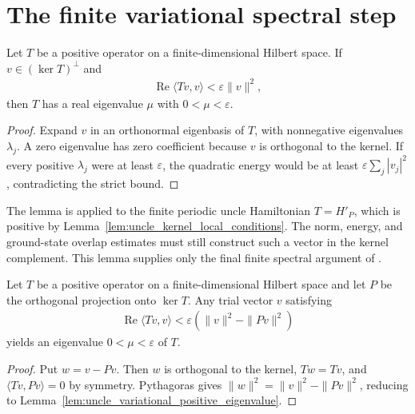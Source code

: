 \section{The finite variational spectral step}
\label{sec:uncle_variational_spectral_step}

\begin{lemma}
    \label{lem:uncle_variational_positive_eigenvalue}
    \leanok
    Let $T$ be a positive operator on a finite-dimensional Hilbert space. If
    $v\in(\ker T)^\perp$ and
    \begin{align}
        \operatorname{Re}\langle Tv,v\rangle<\varepsilon\|v\|^2,
        \label{eq:uncle_variational_rayleigh}
    \end{align}
    then $T$ has a real eigenvalue $\mu$ with
    $0<\mu<\varepsilon$.
\end{lemma}
\begin{proof}\leanok
    Expand $v$ in an orthonormal
    eigenbasis of $T$, with nonnegative eigenvalues $\lambda_j$. A zero
    eigenvalue has zero coefficient because $v$ is orthogonal to the
    kernel. If every positive $\lambda_j$ were at least $\varepsilon$,
    the quadratic energy would be at least
    $\varepsilon\sum_j|v_j|^2$, contradicting the strict bound.
\end{proof}

The lemma is applied to the finite periodic uncle Hamiltonian $T=H'_P$,
which is positive by Lemma~\ref{lem:uncle_kernel_local_conditions}.
The norm, energy, and ground-state overlap estimates must still construct
such a vector in the kernel complement. This lemma supplies only the final
finite spectral argument of
\cite[proof of the gaplessness theorem]{FernandezGonzalez2015Uncle}.

\begin{lemma}
    \label{lem:uncle_variational_projection_bound}
    \leanok
    Let $T$ be a positive operator on a finite-dimensional Hilbert space and
    let $P$ be the orthogonal projection onto $\ker T$.
    Any trial vector $v$ satisfying
    \begin{align}
        \operatorname{Re}\langle Tv,v\rangle
        <\varepsilon(\|v\|^2-\|Pv\|^2)
        \label{eq:uncle_variational_projection_bound}
    \end{align}
    yields an eigenvalue $0<\mu<\varepsilon$ of $T$.
\end{lemma}
\begin{proof}\leanok
    Put $w=v-Pv$. Then $w$ is orthogonal to the kernel,
    $Tw=Tv$, and $\langle Tv,Pv\rangle=0$ by symmetry.
    Pythagoras gives $\|w\|^2=\|v\|^2-\|Pv\|^2$, reducing to
    Lemma~\ref{lem:uncle_variational_positive_eigenvalue}.
\end{proof}

